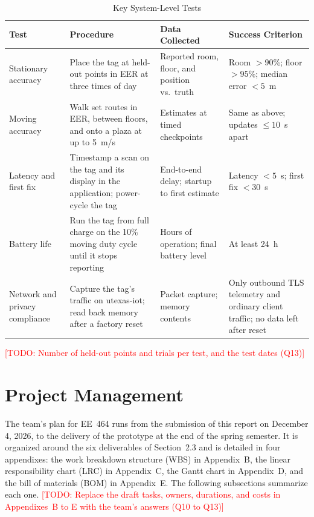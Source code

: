 \documentclass[12pt,letterpaper]{article}
\newenvironment{spectable}{\setstretch{1.0}\renewcommand{\arraystretch}{1.1}}{}
\newcommand{\TODO}[1]{\textcolor{red}{[TODO: #1]}}
\begin{document}
\begin{table}[!htb]
\caption{Key System-Level Tests}
\label{tab:systests}
\centering
\begin{spectable}
\begin{tabularx}{\linewidth}{@{}L{1.15in} Y L{1.2in} L{1.3in}@{}}
\toprule
\textbf{Test} & \textbf{Procedure} & \textbf{Data Collected} & \textbf{Success Criterion} \\
\midrule
Stationary accuracy & Place the tag at held-out points in EER at three times of day & Reported room, floor, and position vs.\ truth & Room $>90$\%; floor $>95$\%; median error $<5$~m \\ \addlinespace
Moving accuracy & Walk set routes in EER, between floors, and onto a plaza at up to 5~m/s & Estimates at timed checkpoints & Same as above; updates $\leq 10$~s apart \\ \addlinespace
Latency and first fix & Timestamp a scan on the tag and its display in the application; power-cycle the tag & End-to-end delay; startup to first estimate & Latency $<5$~s; first fix $<30$~s \\ \addlinespace
Battery life & Run the tag from full charge on the 10\% moving duty cycle until it stops reporting & Hours of operation; final battery level & At least 24~h \\ \addlinespace
Network and privacy compliance & Capture the tag's traffic on utexas-iot; read back memory after a factory reset & Packet capture; memory contents & Only outbound TLS telemetry and ordinary client traffic; no data left after reset \\
\bottomrule
\end{tabularx}
\end{spectable}
\end{table}

\TODO{Number of held-out points and trials per test, and the test dates (Q13)}

\section{Project Management}\label{sec:pm}
The team's plan for EE~464 runs from the submission of this report on December 4, 2026, to the
delivery of the prototype at the end of the spring semester. It is organized around the six
deliverables of Section~2.3 and is detailed in four appendixes: the work breakdown structure (WBS) in
Appendix~B, the linear responsibility chart (LRC) in Appendix~C, the Gantt chart in Appendix~D, and
the bill of materials (BOM) in Appendix~E. The following subsections summarize each one.
\TODO{Replace the draft tasks, owners, durations, and costs in Appendixes~B to E with the team's
answers (Q10 to Q13)}
\end{document}
